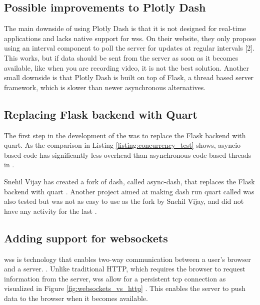 \subsection{Possible improvements to Plotly Dash}
The main downside of using Plotly Dash is that it is not designed for real-time
applications and lacks native support for \glspl{ws}. On their website, they only propose
using an interval component to poll the server for updates at regular intervals
    [2]. This works, but if data should be sent from the server as soon as it becomes
available, like when you are recording video, it is not the best solution.
Another small downside is that Plotly Dash is built on top of Flask, a thread
based server framework, which is slower than newer asynchronous alternatives.

\subsection{Replacing Flask backend with Quart}
The first step in the development of the \guif was to replace the Flask backend with \gls{quart}.
As the comparison in Listing \ref{listing:concurrency_test} shows, \gls{asyncio} based code has significantly less overhead than asynchronous code-based threads in \py.


Snehil Vijay has created a fork of \gls{dash}, called \gls{async-dash}, that replaces the Flask backend with \gls{quart} \cite{vijaySnehilvjAsyncdash2023}.
Another project aimed at making \gls{dash} run \gls{quart} called  was also tested but was not as easy to use as the fork by Snehil Vijay, and did not have any activity for the last  \cite{legrandCodeFrequencyRichlegrand}.


\subsection{Adding support for websockets}
\glspl{ws} is technology that enables two-way communication between a user's browser and a server.
\cite{farhutsWebSocketsBeginnersPart2019}.
Unlike traditional HTTP, which requires the browser to request information from the server, \glspl{ws} allow for a persistent \gls{tcp} connection as visualized in Figure \ref{fig:websockets_vs_http} \cite{tingUnderstandingWebSocketsIts2020}.
This enables the server to push data to the browser when it becomes available.

